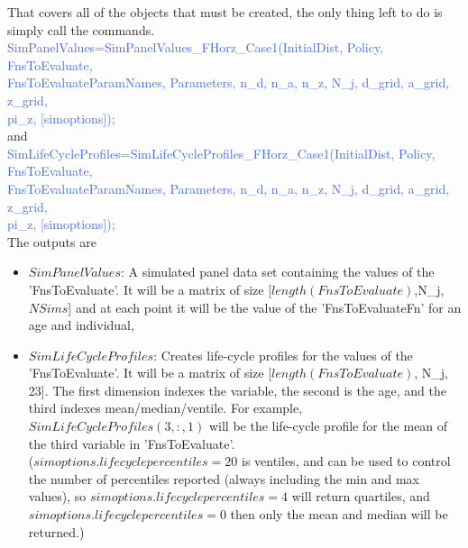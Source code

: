 That covers all of the objects that must be created, the only thing left to do is simply call the commands. \\
\textcolor{RoyalBlue}{SimPanelValues=SimPanelValues\_{}FHorz\_{}Case1(InitialDist, Policy, FnsToEvaluate,} \\
\indent \indent \textcolor{RoyalBlue}{FnsToEvaluateParamNames, Parameters, n\_{}d, n\_{}a, n\_{}z, N\_{}j, d\_{}grid, a\_{}grid, z\_{}grid,}\\
\indent \indent \textcolor{RoyalBlue}{pi\_{}z, [simoptions]);} \\
and \\
\textcolor{RoyalBlue}{SimLifeCycleProfiles=SimLifeCycleProfiles\_{}FHorz\_{}Case1(InitialDist, Policy, FnsToEvaluate,} \\
\indent \indent \textcolor{RoyalBlue}{FnsToEvaluateParamNames, Parameters, n\_{}d, n\_{}a, n\_{}z, N\_{}j, d\_{}grid, a\_{}grid, z\_{}grid,}\\
\indent \indent \textcolor{RoyalBlue}{pi\_{}z, [simoptions]);} \\

The outputs are
\begin{itemize}
 \item $SimPanelValues$: A simulated panel data set containing the values of the 'FnsToEvaluate'. It will be a matrix of size [$length(FnsToEvaluate)$,N\_{}j, $NSims$]
    and at each point it will be the value of the 'FnsToEvaluateFn' for an age and individual,
 \item $SimLifeCycleProfiles$: Creates life-cycle profiles for the values of the 'FnsToEvaluate'. It will be a matrix of size [$length(FnsToEvaluate)$, N\_{}j, 23].
    The first dimension indexes the variable, the second is the age, and the third indexes mean/median/ventile.
    For example, $SimLifeCycleProfiles(3,:,1)$ will be the life-cycle profile for the mean of the third variable in 'FnsToEvaluate'. \\
    \small ($simoptions.lifecyclepercentiles=20$ is ventiles,
    and can be used to control the number of percentiles reported (always including the min and max values), so $simoptions.lifecyclepercentiles=4$
    will return quartiles, and $simoptions.lifecyclepercentiles=0$ then only the mean and median will be returned.)
    \normalsize
\end{itemize}

